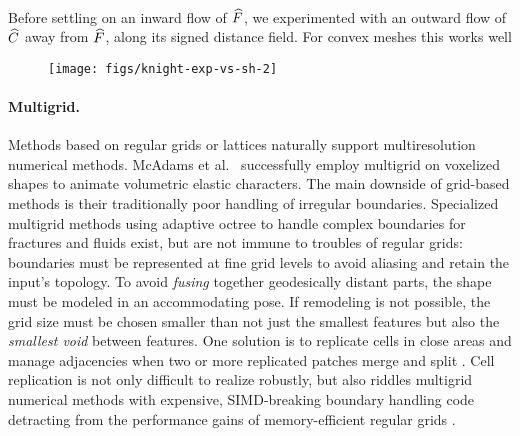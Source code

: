 \paragraph{}
Before settling on an inward flow of $\widehat{F}$, we experimented with an outward
flow of $\widehat{C}$ away from $\widehat{F}$, along its signed distance field.
%
For convex meshes this works well

\begin{figure}
  \texttt{[image: figs/knight-exp-vs-sh-2]}
  \caption{}
  \label{fig:knight-exp-vs-sh}
  \vspace*{-5mm}
\end{figure}

\paragraph{Multigrid.}
%
Methods based on regular grids or lattices naturally support multiresolution
numerical methods.
%
McAdams et al.\ 
successfully employ multigrid on voxelized shapes to animate
volumetric elastic characters.
%
The main downside of grid-based methods is their traditionally poor handling of
irregular boundaries.
%
Specialized multigrid methods using adaptive octree to handle complex
boundaries for fractures \cite{Dick:2011} and fluids \cite{Ferstl:2014} exist,
but are not immune to troubles of regular grids: boundaries must be 
represented at fine grid levels to avoid aliasing and retain the input's
topology.
%
To avoid \emph{fusing} together geodesically distant parts, the
shape must be modeled in an accommodating pose. If remodeling is not
possible, the grid size must be chosen smaller than not just the smallest
features but also the \emph{smallest void} between features.
%
One solution is to replicate cells in close areas and manage
adjacencies when two or more replicated patches merge and split
\cite{Teran:2005:CSS,Nesme:2009:PTE,Sykora09}.
%
Cell replication is not only difficult to realize robustly, but also riddles
multigrid numerical methods with expensive, SIMD-breaking boundary handling
code\newhl{,} detracting from the performance gains of memory-efficient regular grids
\cite{Demmel04}.

